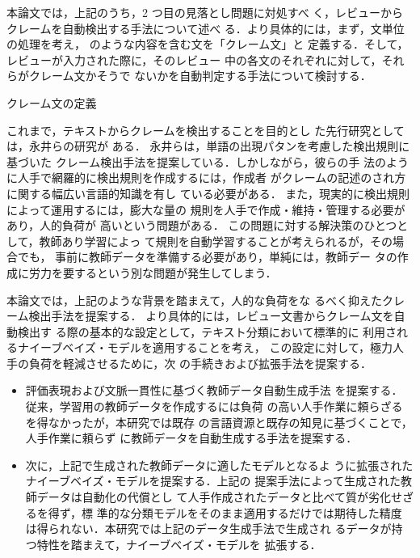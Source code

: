 \documentclass[japanese]{jnlp_1.4}
\def\tab#1{}
\begin{document}
本論文では，上記のうち，2 つ目の見落とし問題に対処すべ
く，レビューからクレームを自動検出する手法について述べ
る．より具体的には，まず，文単位の処理を考え，
\tab{data_detail}のような内容を含む文を「クレーム文」と
定義する．そして，レビューが入力された際に，そのレビュー
中の各文のそれぞれに対して，それらがクレーム文かそうで
ないかを自動判定する手法について検討する．

\begin{table}[b]
 \caption{クレーム文の定義}
 \label{tab:data_detail}

\end{table}

これまで，テキストからクレームを検出することを目的とし
た先行研究としては，永井らの研究\cite{nagai1,nagai2}が
ある．
永井らは，単語の出現パタンを考慮した検出規則に基づいた
クレーム検出手法を提案している．しかしながら，彼らの手
法のように人手で網羅的に検出規則を作成するには，作成者
がクレームの記述のされ方に関する幅広い言語的知識を有し
ている必要がある．
また，現実的に検出規則によって運用するには，膨大な量の
規則を人手で作成・維持・管理する必要があり，人的負荷が
高いという問題がある．
この問題に対する解決策のひとつとして，教師あり学習によっ
て規則を自動学習することが考えられるが，その場合でも，
事前に教師データを準備する必要があり，単純には，教師デー
タの作成に労力を要するという別な問題が発生してしまう．

本論文では，上記のような背景を踏まえて，人的な負荷をな
るべく抑えたクレーム検出手法を提案する．
より具体的には，レビュー文書からクレーム文を自動検出す
る際の基本的な設定として，テキスト分類において標準的に
利用されるナイーブベイズ・モデルを適用することを考え，
この設定に対して，極力人手の負荷を軽減させるために，次
の手続きおよび拡張手法を提案する．



\begin{itemize}
\item 
評価表現および文脈一貫性に基づく教師データ自動生成手法
を提案する．従来，学習用の教師データを作成するには負荷
の高い人手作業に頼らざるを得なかったが，本研究では既存
の言語資源と既存の知見に基づくことで，人手作業に頼らず
に教師データを自動生成する手法を提案する．

\item 
次に，上記で生成された教師データに適したモデルとなるよ
うに拡張されたナイーブベイズ・モデルを提案する．上記の
提案手法によって生成された教師データは自動化の代償とし
て人手作成されたデータと比べて質が劣化せざるを得ず，標
準的な分類モデルをそのまま適用するだけでは期待した精度
は得られない．本研究では上記のデータ生成手法で生成され
るデータが持つ特性を踏まえて，ナイーブベイズ・モデルを
拡張する．

\end{itemize}
\end{document}
